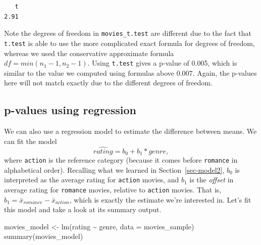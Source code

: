 \documentclass[
  letterpaper,
  DIV=11,
  numbers=noendperiod]{scrreprt}
\newenvironment{Shaded}{\begin{snugshade}}{\end{snugshade}}
\newcommand{\AttributeTok}[1]{\textcolor[rgb]{0.40,0.45,0.13}{#1}}
\newcommand{\FunctionTok}[1]{\textcolor[rgb]{0.28,0.35,0.67}{#1}}
\newcommand{\NormalTok}[1]{\textcolor[rgb]{0.00,0.23,0.31}{#1}}
\newcommand{\OtherTok}[1]{\textcolor[rgb]{0.00,0.23,0.31}{#1}}
\newcommand{\SpecialCharTok}[1]{\textcolor[rgb]{0.37,0.37,0.37}{#1}}
\theoremstyle{definition}
\theoremstyle{remark}
\begin{document}
\begin{Shaded}
\end{Shaded}

\begin{verbatim}
   t 
2.91 
\end{verbatim}

Note the degrees of freedom in \texttt{movies\_t.test} are different due
to the fact that \texttt{t.test} is able to use the more complicated
exact formula for degrees of freedom, whereas we used the conservative
approximate formula \(df = min(n_1 - 1, n_2 - 1)\). Using
\texttt{t.test} gives a p-value of 0.005, which is similar to the value
we computed using formulas above 0.007. Again, the p-values here will
not match exactly due to the different degrees of freedom.

\hypertarget{sec-pvalues-regression}{%
\subsection{p-values using regression}\label{sec-pvalues-regression}}

We can also use a regression model to estimate the difference between
means. We can fit the model \[\widehat{rating} = b_0 + b_1*genre,\]
where \texttt{action} is the reference category (because it comes before
\texttt{romance} in alphabetical order). Recalling what we learned in
Section~\ref{sec-model2}, \(b_0\) is interpreted as the average rating
for \texttt{action} movies, and \(b_1\) is the \emph{offset} in average
rating for \texttt{romance} movies, relative to \texttt{action} movies.
That is, \(b_1 = \bar{x}_{romance} - \bar{x}_{action}\), which is
exactly the estimate we're interested in. Let's fit this model and take
a look at its summary output.

\begin{Shaded}
\begin{Highlighting}[]
\NormalTok{movies\_model }\OtherTok{\textless{}{-}} \FunctionTok{lm}\NormalTok{(rating }\SpecialCharTok{\textasciitilde{}}\NormalTok{ genre, }\AttributeTok{data =}\NormalTok{ movies\_sample)}
\FunctionTok{summary}\NormalTok{(movies\_model)}
\end{Highlighting}
\end{Shaded}
\end{document}
